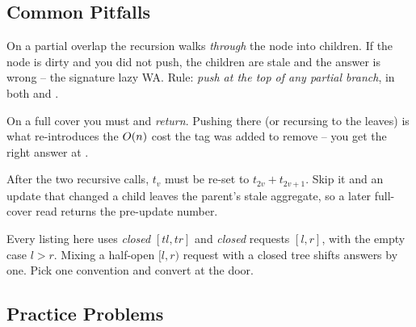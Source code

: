 \subsection{Common Pitfalls}

\begin{warningbox}
On a partial overlap the recursion walks \emph{through} the node into children.  If the node is dirty and you did not push, the children are stale and the answer is wrong -- the signature lazy WA.  Rule: \emph{push at the top of any partial branch}, in both  and .
\end{warningbox}

\begin{warningbox}
On a full cover you must  and \emph{return}.  Pushing there (or recursing to the leaves) is what re-introduces the \(O(n)\) cost the tag was added to remove -- you get the right answer at \tle.
\end{warningbox}

\begin{warningbox}
After the two recursive calls, \(t_v\) must be re-set to \(t_{2v}+t_{2v+1}\).  Skip it and an update that changed a child leaves the parent's stale aggregate, so a later full-cover read returns the pre-update number.
\end{warningbox}

\begin{warningbox}
Every listing here uses \emph{closed} \([tl,tr]\) and \emph{closed} requests \([l,r]\), with the empty case \(l>r\).  Mixing a half-open \([l,r)\) request with a closed tree shifts answers by one.  Pick one convention and convert at the door.
\end{warningbox}

\subsection{Practice Problems}

